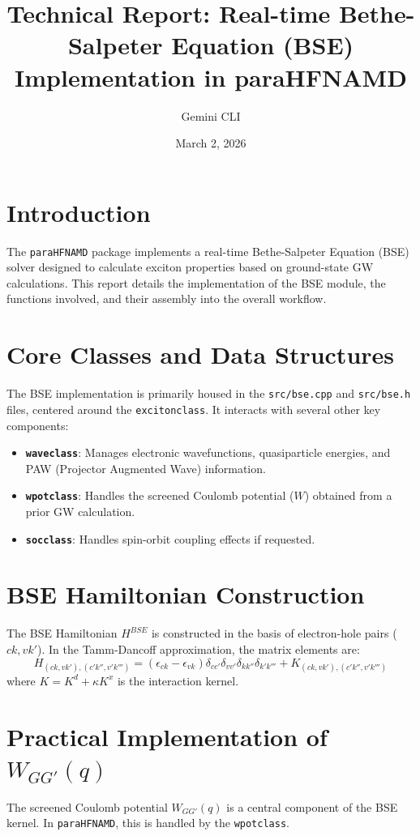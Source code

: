 \documentclass{article}
\title{Technical Report: Real-time Bethe-Salpeter Equation (BSE) Implementation in paraHFNAMD}
\author{Gemini CLI}
\date{March 2, 2026}
\begin{document}
\maketitle

\section{Introduction}
The \texttt{paraHFNAMD} package implements a real-time Bethe-Salpeter Equation (BSE) solver designed to calculate exciton properties based on ground-state GW calculations. This report details the implementation of the BSE module, the functions involved, and their assembly into the overall workflow.

\section{Core Classes and Data Structures}
The BSE implementation is primarily housed in the \texttt{src/bse.cpp} and \texttt{src/bse.h} files, centered around the \texttt{excitonclass}. It interacts with several other key components:
\begin{itemize}
    \item \textbf{\texttt{waveclass}}: Manages electronic wavefunctions, quasiparticle energies, and PAW (Projector Augmented Wave) information.
    \item \textbf{\texttt{wpotclass}}: Handles the screened Coulomb potential ($W$) obtained from a prior GW calculation.
    \item \textbf{\texttt{socclass}}: Handles spin-orbit coupling effects if requested.
\end{itemize}

\section{BSE Hamiltonian Construction}
The BSE Hamiltonian $H^{BSE}$ is constructed in the basis of electron-hole pairs ($ck, vk'$). In the Tamm-Dancoff approximation, the matrix elements are:
\begin{equation}
H_{(ck,vk'), (c'k'',v'k''')} = (\epsilon_{ck} - \epsilon_{vk})\delta_{cc'}\delta_{vv'}\delta_{kk''}\delta_{k'k'''} + K_{(ck,vk'), (c'k'',v'k''')}
\end{equation}
where $K = K^d + \kappa K^x$ is the interaction kernel.

\section{Practical Implementation of $W_{GG'}(q)$}
The screened Coulomb potential $W_{GG'}(q)$ is a central component of the BSE kernel. In \texttt{paraHFNAMD}, this is handled by the \texttt{wpotclass}.
\end{document}
